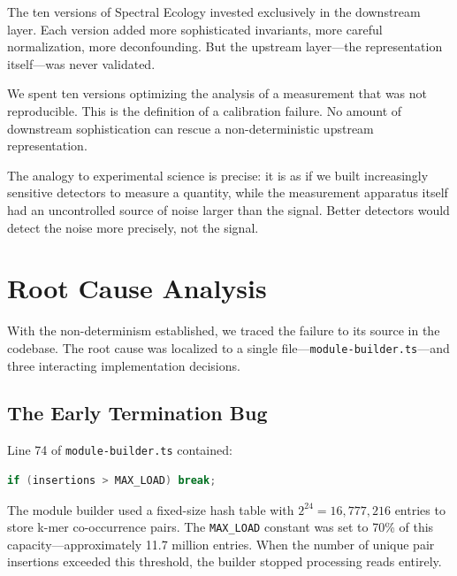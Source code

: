 \documentclass{../yalumba}
\begin{document}
The ten versions of Spectral Ecology invested exclusively in the downstream
layer. Each version added more sophisticated invariants, more careful normalization,
more deconfounding. But the upstream layer---the representation itself---was never
validated.

\begin{limitation}
We spent ten versions optimizing the analysis of a measurement that was not
reproducible. This is the definition of a calibration failure. No amount of
downstream sophistication can rescue a non-deterministic upstream representation.
\end{limitation}

The analogy to experimental science is precise: it is as if we built increasingly
sensitive detectors to measure a quantity, while the measurement apparatus itself
had an uncontrolled source of noise larger than the signal. Better detectors
would detect the noise more precisely, not the signal.


\section{Root Cause Analysis}
\label{sec:rootcause}

With the non-determinism established, we traced the failure to its source in the
codebase. The root cause was localized to a single file---\texttt{module-builder.ts}---and
three interacting implementation decisions.

\subsection{The Early Termination Bug}
\label{sec:earlytermination}

Line 74 of \texttt{module-builder.ts} contained:

\begin{lstlisting}[language=Java,caption={The early termination bug.}]
if (insertions > MAX_LOAD) break;
\end{lstlisting}

The module builder used a fixed-size hash table with $2^{24} = 16{,}777{,}216$
entries to store k-mer co-occurrence pairs. The \texttt{MAX\_LOAD} constant was
set to 70\% of this capacity---approximately 11.7 million entries. When the
number of unique pair insertions exceeded this threshold, the builder stopped
processing reads entirely.
\end{document}
